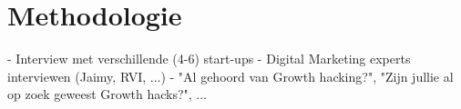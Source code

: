 
\chapter{Methodologie}
\label{ch:methodologie}


- Interview met verschillende (4-6) start-ups
- Digital Marketing experts interviewen (Jaimy, RVI, ...)
- "Al gehoord van Growth hacking?", "Zijn jullie al op zoek geweest Growth hacks?", ...


